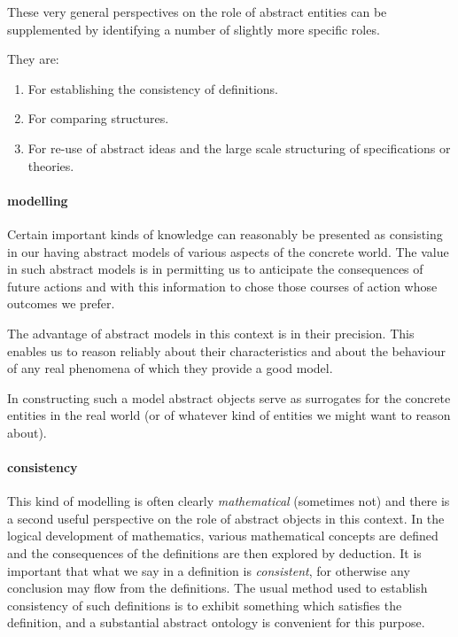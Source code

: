 \documentclass[numreferences]{rbjk}
\begin{document}
\begin{article}
These very general perspectives on the role of abstract entities can be supplemented by identifying a number of slightly more specific roles.

They are:

\begin{enumerate}
\item For establishing the consistency of definitions.
\item For comparing structures.
\item For re-use of abstract ideas and the large scale structuring of specifications or theories.
\end{enumerate}

\paragraph{modelling}

Certain important kinds of knowledge can reasonably be presented as consisting in our having abstract models of various aspects of the concrete world.
The value in such abstract models is in permitting us to anticipate the consequences of future actions and with this information to chose those courses of action whose outcomes we prefer.

The advantage of abstract models in this context is in their precision.
This enables us to reason reliably about their characteristics and about the behaviour of any real phenomena of which they provide a good model.

In constructing such a model abstract objects serve as surrogates for the concrete entities in the real world (or of whatever kind of entities we might want to reason about).

\paragraph{consistency}

This kind of modelling is often clearly \emph{mathematical} (sometimes not) and there is a second useful perspective on the role of abstract objects in this context.
In the logical development of mathematics, various mathematical concepts are defined and the consequences of the definitions are then explored by deduction.
It is important that what we say in a definition is \emph{consistent}, for otherwise any conclusion may flow from the definitions.
The usual method used to establish consistency of such definitions is to exhibit something which satisfies the definition, and a substantial abstract ontology is convenient for this purpose.


\end{article}
\end{document}
